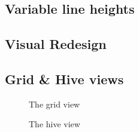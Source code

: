 
	\subsection{Variable line heights} %
	\label{sec:variable_line_heights}
	

	\subsection{Visual Redesign} %
	\label{sec:visual_redesign}
	

	\subsection{Grid \& Hive views} %
	\label{sec:grid_&_hive_views}

\begin{figure}[ht]
\centering
\caption{The grid view}
\label{fig:grid}
\end{figure}

\begin{figure}[ht]
\centering
\caption{The hive view}
\label{fig:hive}
\end{figure}
	
